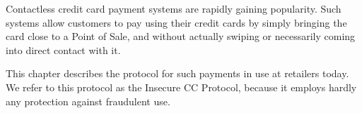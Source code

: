 Contactless credit card payment systems are rapidly gaining popularity.
Such systems allow customers to pay using their credit cards by simply bringing the card close to a Point of Sale,
    and without actually swiping or necessarily coming into direct contact with it.

This chapter describes the protocol for such payments in use at retailers today.
We refer to this protocol as the Insecure CC Protocol, because it employs hardly any protection against fraudulent use.
